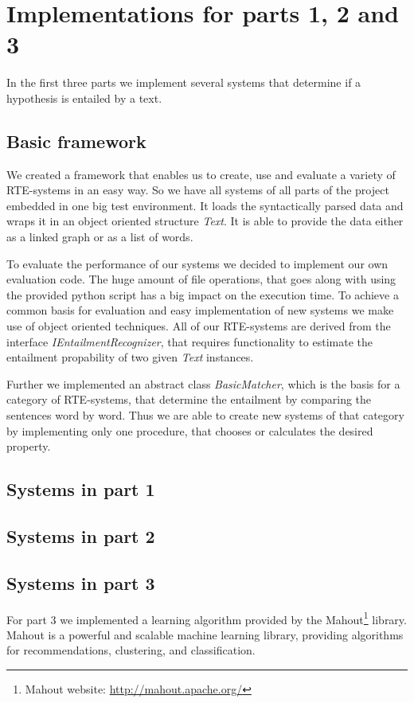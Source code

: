 
\section{Implementations for parts 1, 2 and 3}

In the first three parts we implement several systems that determine if 
a hypothesis is entailed by a text.


\subsection{Basic framework}

We created a framework that enables us to create, use and evaluate
a variety of RTE-systems in an easy way. So we have all systems of all parts
of the project embedded in one big test environment.
It loads the syntactically parsed data and wraps it in an object oriented structure 
\textit{Text}. It is able to provide the data either as a linked graph or as a 
list of words.

To evaluate the performance of our systems we decided to implement our own evaluation
code. The huge amount of file operations, that goes along with using the provided 
python script has a big impact on the execution time.
To achieve a common basis for evaluation and easy implementation of new systems we make use of 
object oriented techniques. All of our RTE-systems are derived from the interface
\textit{IEntailmentRecognizer}, that requires functionality to estimate the entailment
propability of two given \textit{Text} instances.

Further we implemented an abstract class \textit{BasicMatcher}, which is the basis for a
category of RTE-systems, that determine the entailment by comparing the sentences word by word.
Thus we are able to create new systems of that category by implementing only one procedure, 
that chooses or calculates the desired property.

\subsection{Systems in part 1}
\subsection{Systems in part 2}
\subsection{Systems in part 3}
For part 3 we implemented a learning algorithm provided by the Mahout\footnote{Mahout website:
\url{http://mahout.apache.org/}} library. Mahout is a powerful and scalable machine learning library, providing
algorithms for recommendations, clustering, and classification.

